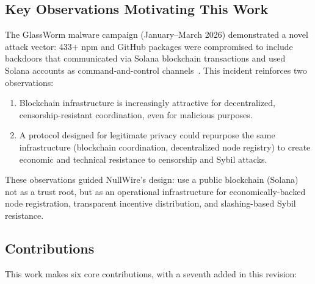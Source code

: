 \documentclass[11pt]{article}
\theoremstyle{definition}
\theoremstyle{remark}
\begin{document}
\subsection{Key Observations Motivating This Work}

The GlassWorm malware campaign (January--March 2026) demonstrated a novel attack vector: 433+ npm and GitHub packages were compromised to include backdoors that communicated via Solana blockchain transactions and used Solana accounts as command-and-control channels~\cite{glassworm2026}. This incident reinforces two observations:

\begin{enumerate}
    \item Blockchain infrastructure is increasingly attractive for decentralized, censorship-resistant coordination, even for malicious purposes.
    \item A protocol designed for legitimate privacy could repurpose the same infrastructure (blockchain coordination, decentralized node registry) to create economic and technical resistance to censorship and Sybil attacks.
\end{enumerate}

These observations guided NullWire's design: use a public blockchain (Solana) not as a trust root, but as an operational infrastructure for economically-backed node registration, transparent incentive distribution, and slashing-based Sybil resistance.

\subsection{Contributions}

This work makes six core contributions, with a seventh added in this revision:
\end{document}
